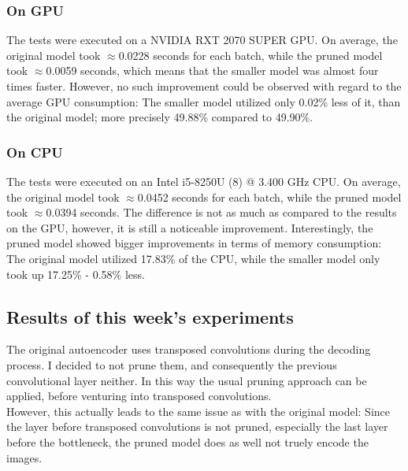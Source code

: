 \documentclass[10pt,twocolumn,letterpaper]{article}
\begin{document}
\subsubsection{On GPU}
The tests were executed on a NVIDIA RXT 2070 SUPER GPU.
On average, the original model took $\approx$0.0228 seconds for each batch, while the pruned model took $\approx$0.0059 seconds, which means that the smaller model was almost four times faster.
However, no such improvement could be observed with regard to the average GPU consumption:
The smaller model utilized only 0.02\% less of it, than the original model; more precisely 49.88\% compared to 49.90\%.
\subsubsection{On CPU}
The tests were executed on an Intel i5-8250U (8) @ 3.400 GHz CPU.
On average, the original model took $\approx$0.0452 seconds for each batch, while the pruned model took $\approx$0.0394 seconds.
The difference is not as much as compared to the results on the GPU, however, it is still a noticeable improvement.
Interestingly, the pruned model showed bigger improvements in terms of memory consumption:
The original model utilized 17.83\% of the CPU, while the smaller model only took up 17.25\% - 0.58\% less.

\subsection{Results of this week's experiments}
The original autoencoder uses transposed convolutions during the decoding process.
I decided to not prune them, and consequently the previous convolutional layer neither.
In this way the usual pruning approach can be applied, before venturing into transposed convolutions.\\
However, this actually leads to the same issue as with the original model:
Since the layer before transposed convolutions is not pruned, especially the last layer before the bottleneck, the pruned model does as well not truely encode the images.
\end{document}
